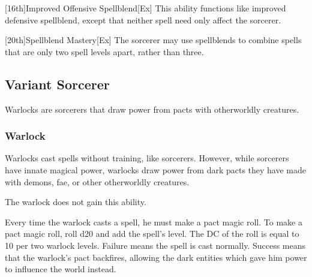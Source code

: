 [16th]{Improved Offensive Spellblend}[Ex]
This ability functions like improved defensive spellblend, except that neither spell need only affect the sorcerer.

[20th]{Spellblend Mastery}[Ex]
The sorcerer may use spellblends to combine spells that are only two spell levels apart, rather than three.

\subsection{Variant Sorcerer}

Warlocks are sorcerers that draw power from pacts with otherworldly creatures.

\subsubsection{Warlock}

Warlocks cast spells without training, like sorcerers.
However, while sorcerers have innate magical power, warlocks draw power from dark pacts they have made with demons, fae, or other otherworldly creatures.

 The warlock does not gain this ability.

 Every time the warlock casts a spell, he must make a pact magic roll.
To make a pact magic roll, roll d20 and add the spell's level.
The DC of the roll is equal to 10  per two warlock levels.
Failure means the spell is cast normally.
Success means that the warlock's pact backfires, allowing the dark entities which gave him power to influence the world instead.

